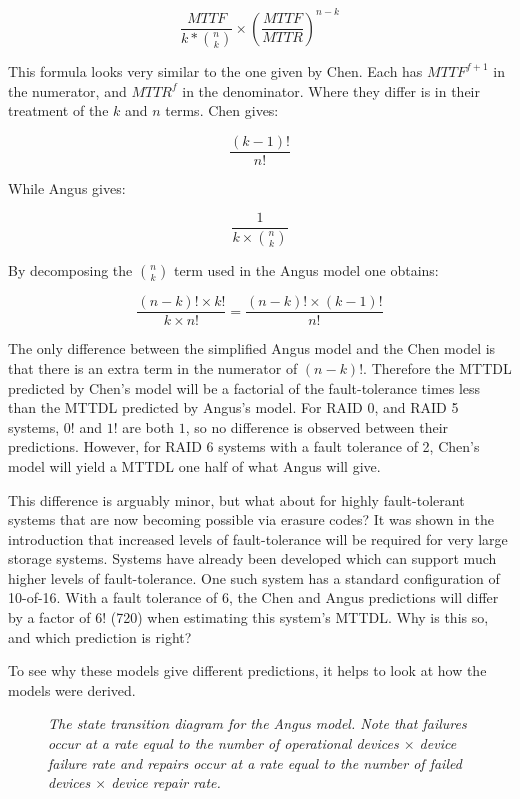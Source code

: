 \documentclass[XXX,endnotes]{usetex-v1}
\begin{document}
$$\frac{MTTF}{k * {{n}\choose{k}}} \times \left(\frac{MTTF}{MTTR}\right)^{n-k}$$

This formula looks very similar to the one given by Chen.  Each has $MTTF^{f+1}$ in the numerator, and $MTTR^{f}$ in the denominator.  Where they differ is in their treatment of the $k$ and $n$ terms.  Chen gives:

$$\frac{(k-1)!}{n!}$$

While Angus gives:

$$\frac{1}{k \times {{n}\choose{k}} }$$

By decomposing the ${{n}\choose{k}}$ term used in the Angus model one obtains:

$$\frac{(n-k)! \times k!}{k \times n!} = \frac{(n-k)! \times (k-1)!}{n!}$$

The only difference between the simplified Angus model and the Chen model is that there is an extra term in the numerator of $(n-k)!$.  Therefore the MTTDL predicted by Chen's model will be a factorial of the fault-tolerance times less than the MTTDL predicted by Angus's model.  For RAID 0, and RAID 5 systems, $0!$ and $1!$ are both $1$, so no difference is observed between their predictions.  However, for RAID 6 systems with a fault tolerance of 2, Chen's model will yield a MTTDL one half of what Angus will give.

This difference is arguably minor, but what about for highly fault-tolerant systems that are now becoming possible via erasure codes?  It was shown in the introduction that increased levels of fault-tolerance will be required for very large storage systems.  Systems have already been developed\cite{oceanstore, tahoe, wuala} which can support much higher levels of fault-tolerance.  One such system has a standard configuration of 10-of-16.  With a fault tolerance of 6, the Chen and Angus predictions will differ by a factor of $6!$ (720) when estimating this system's MTTDL.  Why is this so, and which prediction is right?

To see why these models give different predictions, it helps to look at how the models were derived.  


\begin{figure}[htbp]
\begin{centering}
\small\itshape
\caption{\small\itshape The state transition diagram for the Angus model.  Note that failures occur at a rate equal to the number of operational devices $\times$ device failure rate and repairs occur at a rate equal to the number of failed devices $\times$ device repair rate.}
\label{fig-sample}
\end{centering}
\end{figure}
\end{document}
